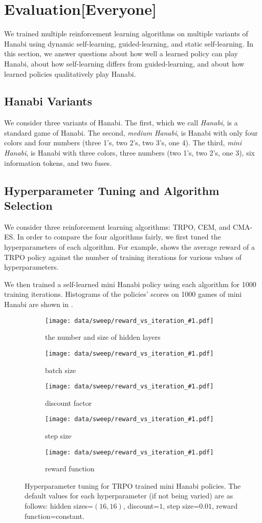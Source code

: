 \section{Evaluation[Everyone]}\label{sec:eval}

We trained multiple reinforcement learning algorithms on multiple variants of
Hanabi using dynamic self-learning, guided-learning, and static self-learning.
In this section, we answer questions about how well a learned policy can play
Hanabi, about how self-learning differs from guided-learning, and about how
learned policies qualitatively play Hanabi.

\subsection{Hanabi Variants}
We consider three variants of Hanabi. The first, which we call \emph{Hanabi},
is a standard game of Hanabi. The second, \emph{medium Hanabi}, is Hanabi with
only four colors and four numbers (three 1's, two 2's, two 3's, one 4). The
third, \emph{mini Hanabi}, is Hanabi with three colors, three numbers (two 1's,
two 2's, one 3), six information tokens, and two fuses.

\subsection{Hyperparameter Tuning and Algorithm Selection}
We consider three reinforcement learning algorithms: TRPO, CEM, and CMA-ES. In
order to compare the four algorithms fairly, we first tuned the hyperparameters
of each algorithm. For example,  shows the average reward
of a TRPO policy against the number of training iterations for various values
of hyperparameters.

We then trained a self-learned mini Hanabi policy using each algorithm for 1000
training iterations. Histograms of the policies' scores on 1000 games of mini
Hanabi are shown in .

\begin{figure}[ht]
  \newcommand{\hyperparamsubfig}[3]{%
    \begin{subfigure}[t]{0.32\textwidth}
      \centering
      \texttt{[image: data/sweep/reward\_vs\_iteration\_\#1.pdf]}
      \caption{#2}\label{fig:#3}
    \end{subfigure}
  }

  \centering

  \hyperparamsubfig{hidden_sizes}{the number and size of hidden layers}{}
  \hyperparamsubfig{batch_size}{batch size}{}
  \hyperparamsubfig{discount}{discount factor}{}

  \hyperparamsubfig{step_size}{step size}{}
  \hyperparamsubfig{reward}{reward function}{}

  \caption{
    Hyperparameter tuning for TRPO trained mini Hanabi policies. The default
    values for each hyperparameter (if not being varied) are as follows: hidden
    sizes=$(16, 16)$, discount=$1$, step size=$0.01$, reward function=constant.
  }\label{fig:trpo-tuning}
\end{figure}

